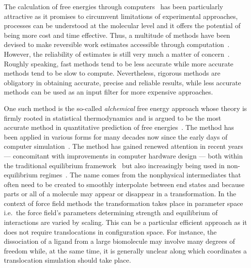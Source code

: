 \documentclass[journal=jctcce,manuscript=article]{achemso}
\begin{document}
The calculation of free energies through
computers~\cite{hansen_practical_2014, doi:10.1021/jp102971x,
  Gallicchio201127, doi:10.1080/08927022.2015.1132317,
  doi:10.1146/annurev.matsci.32.111901.153708} has been particularly
attractive as it promises to circumvent limitations of experimental
approaches, processes can be understood at the molecular level and it
offers the potential of being more cost and time effective.  Thus, a
multitude of methods have been devised to make reversible work
estimates accessible through computation~\cite{hansen_practical_2014,
  doi:10.1021/jp102971x, Gallicchio201127,
  doi:10.1080/08927022.2015.1132317,
  doi:10.1146/annurev.matsci.32.111901.153708}.  However, the
reliability of estimates is still very much a matter of
concern~\cite{doi:10.1021/jp102971x}.  Roughly speaking, fast methods
tend to be less accurate while more accurate methods tend to be slow
to compute.  Nevertheless, rigorous methods are obligatory in
obtaining accurate, precise and reliable results, while less accurate
methods can be used as an input filter for more expensive approaches.

One such method is the so-called \emph{alchemical} free energy
approach whose theory is firmly rooted in statistical thermodynamics
and is argued to be the most accurate method in quantitative
prediction of free energies~\cite{Beveridge-citeulike:3789890,
  straatsma:92,doi:10.1021/cr00023a004,hansen_practical_2014}.  The
method has been applied in various forms for many decades now since
the early days of computer simulation~\cite{doi:10.1063/1.1671118,
  bennett_efficient_1976, doi:10.1063/1.432264, FS9821700055,
  Tembe1984281, doi:10.1063/1.449208}.  The method has gained renewed
attention in recent years --- concomitant with improvements in
computer hardware design --- both within the traditional equilibrium
framework~\cite{GILSON19971047, doi:10.1021/jp0217839,
  deng_computations_2009} but also increasingly being used in
non-equilibrium regimes~\cite{ytreberg_comparison_2006, JCC:JCC23804,
  doi:10.1021/ct500964e}.  The name comes from the nonphysical
intermediates that often need to be created to smoothly interpolate
between end states and because parts or all of a molecule may appear
or disappear in a transformation.  In the context of force field
methods the transformation takes place in parameter space i.e.\ the
force field's parameters determining strength and equilibrium of
interactions are varied by scaling.  This can be a particular
efficient approach as it does not require translocations in
configuration space.  For instance, the dissociation of a ligand from
a large biomolecule may involve many degrees of freedom while, at the
same time, it is generally unclear along which coordinates a
translocation simulation should take place.
\end{document}
